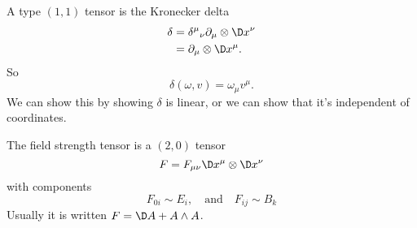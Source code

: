 \medbreak
\begin{ex}
A type $(1,1)$ tensor is the Kronecker delta
\begin{subequations}
\begin{align}
\delta
&={\delta^{\mu}}_{\nu}\partial_{\mu}\otimes\D x^{\nu}\\
&=\partial_{\mu}\otimes\D x^{\mu}.
\end{align}
\end{subequations}
So 
\begin{equation}
\delta(\omega,v)=\omega_{\mu}v^{\mu}.
\end{equation}
We can show this by showing $\delta$ is linear, or we can show
that it's independent of coordinates.
\end{ex}
\begin{ex}
The field strength tensor is a $(2,0)$ tensor 
\begin{equation}
F=F_{\mu\nu}\D x^{\mu}\otimes\D x^{\nu}
\end{equation}
with components
\begin{equation}
F_{0i}\sim E_{i},\quad\mbox{and}\quad F_{ij}\sim B_{k}
\end{equation}
Usually it is written $F=\D A+A\wedge A$.
\end{ex}
